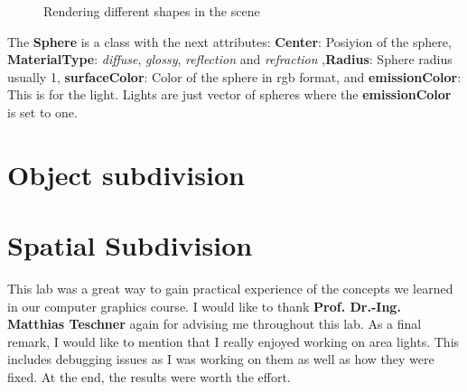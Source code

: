 \documentclass[11pt,a4paper]{article}
\begin{document}
\begin{figure}[ht]
\begin{center}
		\caption{Rendering different shapes in the scene}
		\label{fig:5}
		
	\end{center}
\end{figure}

    The \textbf{Sphere} is a class with the next attributes: \textbf{Center}: Posiyion of the sphere, \textbf{MaterialType}: \textit{diffuse}, \textit{glossy}, \textit{reflection} and \textit{refraction} ,\textbf{Radius}: Sphere radius usually 1, \textbf{surfaceColor}: Color of the sphere in rgb format, and \textbf{emissionColor}: This is for the light.   
	Lights are just vector of spheres where the \textbf{emissionColor} is set to one.
	\section{Object subdivision}
	\section{Spatial Subdivision}
	
	This lab was a great way to gain practical experience of the concepts we learned in our computer graphics course. I would like to thank \textbf{Prof. Dr.-Ing. Matthias Teschner} again for advising me throughout this lab. As a final remark, I would like to mention that I really enjoyed working on area lights. This includes debugging issues as I was working on them as well as how they were fixed. At the end, the results were worth the effort.
	
	
	
	
\end{document}
